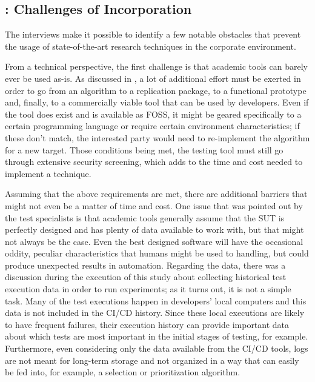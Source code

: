 \subsection{: Challenges of Incorporation}
\label{sec:ind_rq2}

The interviews make it possible to identify a few notable obstacles that prevent the usage of state-of-the-art research techniques in the corporate environment.

From a technical perspective, the first challenge is that academic tools can barely ever be used as-is.
As discussed in , a lot of additional effort must be exerted in order to go from an algorithm to a replication package, to a functional prototype and, finally, to a commercially viable tool that can be used by developers.
Even if the tool does exist and is available as FOSS, it might be geared specifically to a certain programming language or require certain environment characteristics; if these don't match, the interested party would need to re-implement the algorithm for a new target.
Those conditions being met, the testing tool must still go through extensive security screening, which adds to the time and cost needed to implement a technique.

Assuming that the above requirements are met, there are additional barriers that might not even be a matter of time and cost.
One issue that was pointed out by the test specialists is that academic tools generally assume that the SUT is perfectly designed and has plenty of data available to work with, but that might not always be the case.
Even the best designed software will have the occasional oddity, peculiar characteristics that humans might be used to handling, but could produce unexpected results in automation.
Regarding the data, there was a discussion during the execution of this study about collecting historical test execution data in order to run experiments; as it turns out, it is not a simple task.
Many of the test executions happen in developers' local computers and this data is not included in the CI/CD history.
Since these local executions are likely to have frequent failures, their execution history can provide important data about which tests are most important in the initial stages of testing, for example.
Furthermore, even considering only the data available from the CI/CD tools, logs are not meant for long-term storage and not organized in a way that can easily be fed into, for example, a selection or prioritization algorithm.

